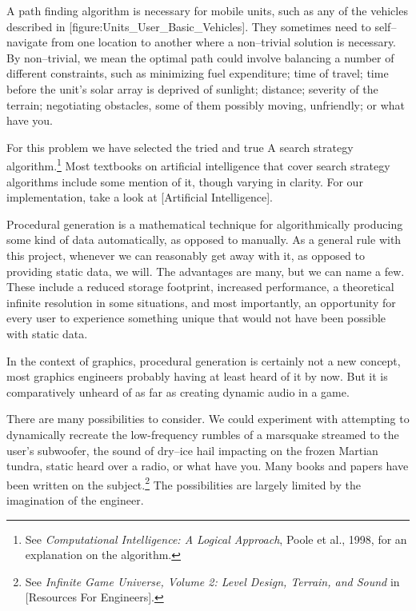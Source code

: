 A path finding algorithm is necessary for mobile units, such as any of the vehicles described in [figure:Units_User_Basic_Vehicles]. They sometimes need to self--navigate from one location to another where a non--trivial solution is necessary. By non--trivial, we mean the optimal path could involve balancing a number of different constraints, such as minimizing fuel expenditure; time of travel; time before the unit's solar array is deprived of sunlight; distance; severity of the terrain; negotiating obstacles, some of them possibly moving, unfriendly; or what have you.

For this problem we have selected the tried and true A\high{*} search strategy algorithm.\footnote{See {\it Computational Intelligence: A Logical Approach}, Poole et al., 1998, for an explanation on the algorithm.} Most textbooks on artificial intelligence that cover search strategy algorithms include some mention of it, though varying in clarity. For our implementation, take a look at [Artificial Intelligence].

Procedural generation is a mathematical technique for algorithmically producing some kind of data automatically, as opposed to manually. As a general rule with this project, whenever we can reasonably get away with it, as opposed to providing static data, we will. The advantages are many, but we can name a few. These include a reduced storage footprint, increased performance, a theoretical infinite resolution in some situations, and most importantly, an opportunity for every user to experience something unique that would not have been possible with static data.

In the context of graphics, procedural generation is certainly not a new concept, most graphics engineers probably having at least heard of it by now. But it is comparatively unheard of as far as creating dynamic audio in a game. 

There are many possibilities to consider. We could experiment with attempting to dynamically recreate the low-frequency rumbles of a marsquake streamed to the user's subwoofer, the sound of dry--ice hail impacting on the frozen Martian tundra, static heard over a radio, or what have you. Many books and papers have been written on the subject.\footnote{See {\it Infinite Game Universe, Volume 2: Level Design, Terrain, and Sound} in [Resources For Engineers].} The possibilities are largely limited by the imagination of the engineer.

